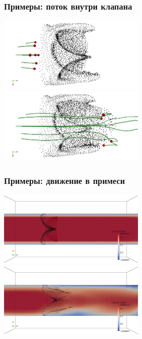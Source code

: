 \documentclass[14pt]{beamer}
\begin{document}
\begin{frame}
\frametitle{Примеры: поток внутри клапана}
    \begin{center}
        \vspace{-1.40mm}
        \includegraphics[width=7cm]{uniline_tracks_1.png}
        \vspace{0.40mm}
        \includegraphics[width=7cm]{uniline_tracks_2.png}
    \end{center}
\end{frame}

\begin{frame}
\frametitle{Примеры: движение в примеси}
    \begin{center}
        \vspace{-1.40mm}
        \includegraphics[width=7cm]{valve_in_mixture_1.png}
        \vspace{0.40mm}
        \includegraphics[width=7cm]{valve_in_mixture_2.png}
    \end{center}
\end{frame}
\end{document}
